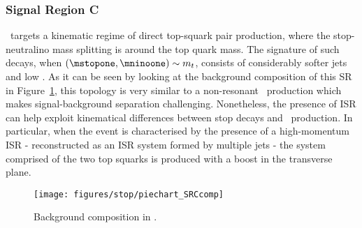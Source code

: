 			\subsubsection*{Signal Region C}

				\SRC\ targets a kinematic regime of direct top-squark pair production, where the stop-neutralino mass splitting is around the top quark mass. The signature of such decays, when $(\mstopone, \mninoone) \sim m_t$, consists of considerably softer jets and low \met. As it can be seen by looking at the background composition of this \ac{SR} in Figure~\ref{fig:SRC_bkgcomp}, this topology is very similar to a non-resonant \ttbar\ production which makes signal-background separation challenging. Nonetheless, the presence of \ac{ISR} can help exploit kinematical differences between stop decays and \ttbar\ production. In particular, when the event is characterised by the presence of a high-momentum \ac{ISR} - reconstructed as an \ac{ISR} system formed by multiple jets - the system comprised of the two top squarks is produced with a boost in the transverse plane.

				\begin{figure}[t]
				  \begin{center}
				   \texttt{[image: figures/stop/piechart\_SRCcomp]}
				   \caption{Background composition in \SRC.}
				   \label{fig:SRC_bkgcomp}
				  \end{center}
				\end{figure}

